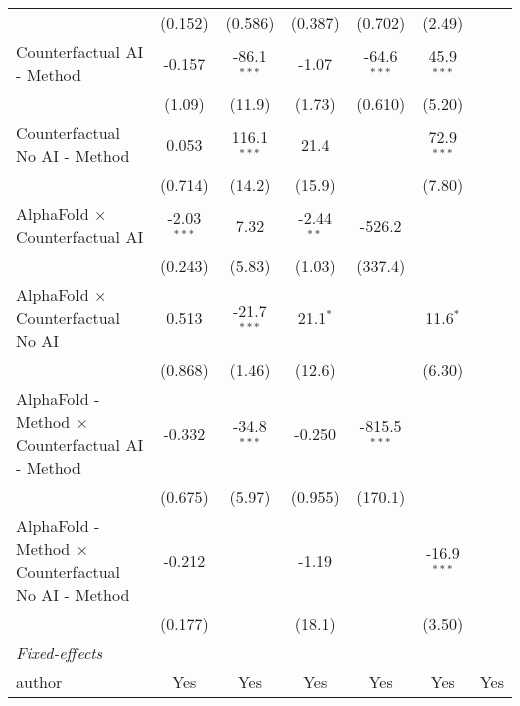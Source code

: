 \begin{tabular}{lcccccc}
                                                              & (0.152)       & (0.586)       & (0.387)      & (0.702)        & (2.49)        &   \\   
   Counterfactual AI - Method                                 & -0.157        & -86.1$^{***}$ & -1.07        & -64.6$^{***}$  & 45.9$^{***}$  &   \\   
                                                              & (1.09)        & (11.9)        & (1.73)       & (0.610)        & (5.20)        &   \\   
   Counterfactual No AI - Method                              & 0.053         & 116.1$^{***}$ & 21.4         &                & 72.9$^{***}$  &   \\   
                                                              & (0.714)       & (14.2)        & (15.9)       &                & (7.80)        &   \\   
   AlphaFold $\times$ Counterfactual AI                       & -2.03$^{***}$ & 7.32          & -2.44$^{**}$ & -526.2         &               &   \\   
                                                              & (0.243)       & (5.83)        & (1.03)       & (337.4)        &               &   \\   
   AlphaFold $\times$ Counterfactual No AI                    & 0.513         & -21.7$^{***}$ & 21.1$^{*}$   &                & 11.6$^{*}$    &   \\   
                                                              & (0.868)       & (1.46)        & (12.6)       &                & (6.30)        &   \\   
   AlphaFold - Method $\times$ Counterfactual AI - Method     & -0.332        & -34.8$^{***}$ & -0.250       & -815.5$^{***}$ &               &   \\   
                                                              & (0.675)       & (5.97)        & (0.955)      & (170.1)        &               &   \\   
   AlphaFold - Method $\times$ Counterfactual No AI - Method  & -0.212        &               & -1.19        &                & -16.9$^{***}$ &   \\   
                                                              & (0.177)       &               & (18.1)       &                & (3.50)        &   \\   
   \midrule
   \emph{Fixed-effects}\\
   author                                                     & Yes           & Yes           & Yes          & Yes            & Yes           & Yes\\  

\end{tabular}
